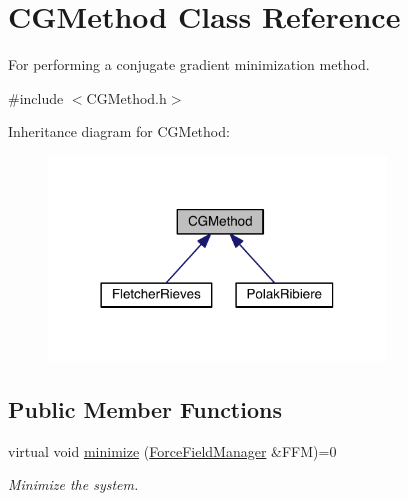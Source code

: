 \hypertarget{classCGMethod}{\section{C\+G\+Method Class Reference}
\label{classCGMethod}
}


For performing a conjugate gradient minimization method.  




{\ttfamily \#include $<$C\+G\+Method.\+h$>$}



Inheritance diagram for C\+G\+Method\+:\nopagebreak
\begin{figure}[H]
\begin{center}
\leavevmode
\includegraphics[width=254pt]{classCGMethod__inherit__graph}
\end{center}
\end{figure}
\subsection*{Public Member Functions}
\begin{DoxyCompactItemize}
\item 
virtual void \hyperlink{classCGMethod_a7a03bce08f9b88d41392894d071a1ff7}{minimize} (\hyperlink{classForceFieldManager}{Force\+Field\+Manager} \&F\+F\+M)=0
\begin{DoxyCompactList}\small\item\em Minimize the system. \end{DoxyCompactList}\end{DoxyCompactItemize}
